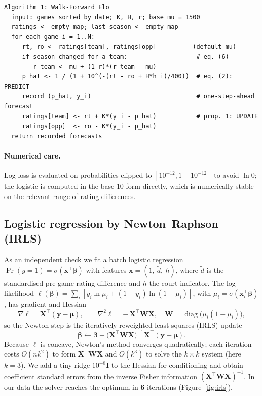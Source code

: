 \documentclass[11pt]{article}
\begin{document}
\begin{verbatim}
Algorithm 1: Walk-Forward Elo
  input: games sorted by date; K, H, r; base mu = 1500
  ratings <- empty map; last_season <- empty map
  for each game i = 1..N:
     rt, ro <- ratings[team], ratings[opp]          (default mu)
     if season changed for a team:                   # eq. (6)
        r_team <- mu + (1-r)*(r_team - mu)
     p_hat <- 1 / (1 + 10^(-(rt - ro + H*h_i)/400))  # eq. (2): PREDICT
     record (p_hat, y_i)                             # one-step-ahead forecast
     ratings[team] <- rt + K*(y_i - p_hat)           # prop. 1: UPDATE
     ratings[opp]  <- ro - K*(y_i - p_hat)
  return recorded forecasts
\end{verbatim}

\paragraph{Numerical care.} Log-loss is evaluated on probabilities clipped to
$[10^{-12}, 1-10^{-12}]$ to avoid $\ln 0$; the logistic is computed in the
base-$10$ form directly, which is numerically stable on the relevant range of
rating differences.

\subsection{Logistic regression by Newton--Raphson (IRLS)}
As an independent check we fit a batch logistic regression
$\Pr(y=1) = \sigma(\mathbf{x}^\top\boldsymbol\beta)$ with features
$\mathbf{x} = (1,\ \tilde d,\ h)$, where $\tilde d$ is the standardised pre-game
rating difference and $h$ the court indicator. The log-likelihood
$\ell(\boldsymbol\beta) = \sum_i [y_i \ln \mu_i + (1-y_i)\ln(1-\mu_i)]$, with
$\mu_i = \sigma(\mathbf{x}_i^\top\boldsymbol\beta)$, has gradient and Hessian
\begin{equation}
\nabla \ell = \mathbf{X}^\top(\mathbf{y} - \boldsymbol\mu), \qquad
\nabla^2 \ell = -\,\mathbf{X}^\top \mathbf{W} \mathbf{X}, \quad
\mathbf{W} = \operatorname{diag}\!\big(\mu_i(1-\mu_i)\big),
\end{equation}
so the Newton step is the iteratively reweighted least squares (IRLS) update
\begin{equation}
\boldsymbol\beta \leftarrow \boldsymbol\beta
+ \big(\mathbf{X}^\top \mathbf{W}\mathbf{X}\big)^{-1}\mathbf{X}^\top(\mathbf{y}-\boldsymbol\mu).
\label{eq:irls}
\end{equation}
Because $\ell$ is concave, Newton's method converges quadratically; each iteration
costs $O(nk^2)$ to form $\mathbf{X}^\top\mathbf{W}\mathbf{X}$ and $O(k^3)$ to solve
the $k\times k$ system (here $k=3$). We add a tiny ridge $10^{-8}\mathbf I$ to the
Hessian for conditioning and obtain coefficient standard errors from the inverse
Fisher information $(\mathbf{X}^\top\mathbf{W}\mathbf{X})^{-1}$. In our data the
solver reaches the optimum in \textbf{6} iterations (Figure~\ref{fig:irls}).
\end{document}
